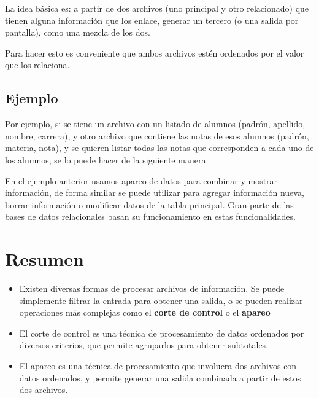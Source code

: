 La idea básica es: a partir de dos archivos (uno principal y otro
relacionado) que tienen alguna información que los enlace, generar un
tercero (o una salida por pantalla), como una mezcla de los dos.

Para hacer esto es conveniente que ambos archivos estén ordenados por el valor
que los relaciona.

\subsection*{Ejemplo}

Por ejemplo, si se tiene un archivo con un listado de alumnos (padrón,
apellido, nombre, carrera), y otro archivo que contiene las notas de esos
alumnos (padrón, materia, nota), y se quieren listar todas las notas que
corresponden a cada uno de los alumnos, se lo puede hacer de la siguiente
manera.



En el ejemplo anterior usamos apareo de datos para combinar y mostrar
información, de forma similar se puede utilizar para agregar información nueva,
borrar información o modificar datos de la tabla principal. Gran parte de las
bases de datos relacionales basan su funcionamiento en estas funcionalidades.

\section{Resumen}

\begin{itemize}

\item Existen diversas formas de procesar archivos de información.  Se
puede simplemente filtrar la entrada para obtener una salida, o se pueden
realizar operaciones más complejas como el {\bf corte de control} o el {\bf
apareo}

\item El corte de control es una técnica de procesamiento de datos
ordenados por diversos criterios, que permite agruparlos para obtener
subtotales.

\item El apareo es una técnica de procesamiento que involucra dos archivos
con datos ordenados, y permite generar una salida combinada a partir de
estos dos archivos.

\end{itemize}

